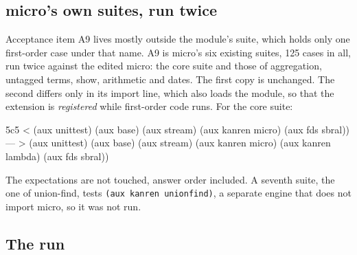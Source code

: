 \subsection{micro's own suites, run twice}\label{sec:roadmap-a9}

Acceptance item A9 lives mostly outside the module's suite, which holds only one first-order case under
that name. A9 is micro's six existing suites, 125 cases in all, run twice against the edited micro: the
core suite and those of aggregation, untagged terms, show, arithmetic and dates. The first copy is
unchanged. The second differs only in its import line, which also loads the module, so that the
extension is \emph{registered} while first-order code runs. For the core suite:
\begin{answers}
5c5
<   (aux unittest) (aux base) (aux stream) (aux kanren micro) (aux fds sbral))
---
>   (aux unittest) (aux base) (aux stream) (aux kanren micro) (aux kanren lambda) (aux fds sbral))
\end{answers}
The expectations are not touched, answer order included. A seventh suite, the one of union-find, tests
\texttt{(aux kanren unionfind)}, a separate engine that does not import micro, so it was not run.

\subsection{The run}\label{sec:roadmap-run}

